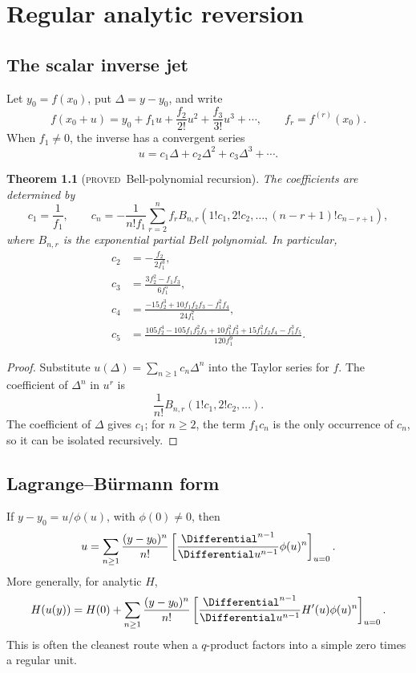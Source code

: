 \documentclass[11pt,letterpaper,oneside,openany]{book}
\newtheorem{theorem}{Theorem}[chapter]
\theoremstyle{definition}
\theoremstyle{remark}
\newcommand{\statusproved}{\textcolor{provedgreen}{\textsc{proved}}}
\begin{document}
\chapter{Regular analytic reversion}

\section{The scalar inverse jet}
Let \(y_0=f(x_0)\), put \(\Delta=y-y_0\), and write
\[
 f(x_0+u)=y_0+f_1u+\frac{f_2}{2!}u^2+\frac{f_3}{3!}u^3+\cdots,
 \qquad f_r=f^{(r)}(x_0).
\]
When \(f_1\ne0\), the inverse has a convergent series
\[
 u=c_1\Delta+c_2\Delta^2+c_3\Delta^3+\cdots.
\]

\begin{theorem}[\statusproved\ Bell-polynomial recursion]
The coefficients are determined by
\[
 c_1=\frac1{f_1},
 \qquad
 c_n=-\frac1{n!f_1}\sum_{r=2}^{n}f_r
 B_{n,r}(1!c_1,2!c_2,\ldots,(n-r+1)!c_{n-r+1}),
\]
where \(B_{n,r}\) is the exponential partial Bell polynomial.  In particular,
\begin{align*}
 c_2&=-\frac{f_2}{2f_1^3},\\
 c_3&=\frac{3f_2^2-f_1f_3}{6f_1^5},\\
 c_4&=\frac{-15f_2^3+10f_1f_2f_3-f_1^2f_4}{24f_1^7},\\
 c_5&=\frac{105f_2^4-105f_1f_2^2f_3+10f_1^2f_3^2
 +15f_1^2f_2f_4-f_1^3f_5}{120f_1^9}.
\end{align*}
\end{theorem}
\begin{proof}
Substitute \(u(\Delta)=\sum_{n\ge1}c_n\Delta^n\) into the Taylor series for
\(f\).  The coefficient of \(\Delta^n\) in \(u^r\) is
\[
 \frac{1}{n!}B_{n,r}(1!c_1,2!c_2,\ldots).
\]
The coefficient of \(\Delta\) gives \(c_1\); for \(n\ge2\), the term
\(f_1c_n\) is the only occurrence of \(c_n\), so it can be isolated
recursively.
\end{proof}

\section{Lagrange--Bürmann form}
If \(y-y_0=u/\phi(u)\), with \(\phi(0)\ne0\), then
\[
 u=\sum_{n\ge1}\frac{(y-y_0)^n}{n!}
 \left[\frac{\Differential^{n-1}}{\Differential u^{n-1}}\phi(u)^n\right]_{u=0}.
\]
More generally, for analytic \(H\),
\[
 H(u(y))=H(0)+\sum_{n\ge1}\frac{(y-y_0)^n}{n!}
 \left[\frac{\Differential^{n-1}}{\Differential u^{n-1}}
 H'(u)\phi(u)^n\right]_{u=0}.
\]
This is often the cleanest route when a \(q\)-product factors into a simple
zero times a regular unit.
\end{document}
